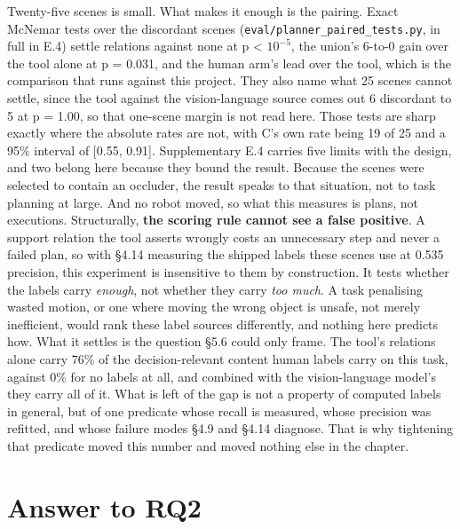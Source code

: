 Twenty-five scenes is small. What makes it enough is the pairing. Exact McNemar tests over the discordant scenes (\texttt{eval/planner\_\allowbreak{}paired\_\allowbreak{}tests.py}, in full in E.4) settle relations against none at p < $10^{-5}$, the union's 6-to-0 gain over the tool alone at p = 0.031, and the human arm's lead over the tool, which is the comparison that runs against this project. They also name what 25 scenes cannot settle, since the tool against the vision-language source comes out 6 discordant to 5 at p = 1.00, so that one-scene margin is not read here. Those tests are sharp exactly where the absolute rates are not, with C's own rate being 19 of 25 and a 95\% interval of [0.55, 0.91]. Supplementary E.4 carries five limits with the design, and two belong here because they bound the result. Because the scenes were selected to contain an occluder, the result speaks to that situation, not to task planning at large. And no robot moved, so what this measures is plans, not executions. Structurally, \textbf{the scoring rule cannot see a false positive}. A support relation the tool asserts wrongly costs an unnecessary step and never a failed plan, so with \S{}4.14 measuring the shipped labels these scenes use at 0.535 precision, this experiment is insensitive to them by construction. It tests whether the labels carry \textit{enough}, not whether they carry \textit{too much}. A task penalising wasted motion, or one where moving the wrong object is unsafe, not merely inefficient, would rank these label sources differently, and nothing here predicts how. What it settles is the question \S{}5.6 could only frame. The tool's relations alone carry 76\% of the decision-relevant content human labels carry on this task, against 0\% for no labels at all, and combined with the vision-language model's they carry all of it. What is left of the gap is not a property of computed labels in general, but of one predicate whose recall is measured, whose precision was refitted, and whose failure modes \S{}4.9 and \S{}4.14 diagnose. That is why tightening that predicate moved this number and moved nothing else in the chapter.

\section{Answer to RQ2}

